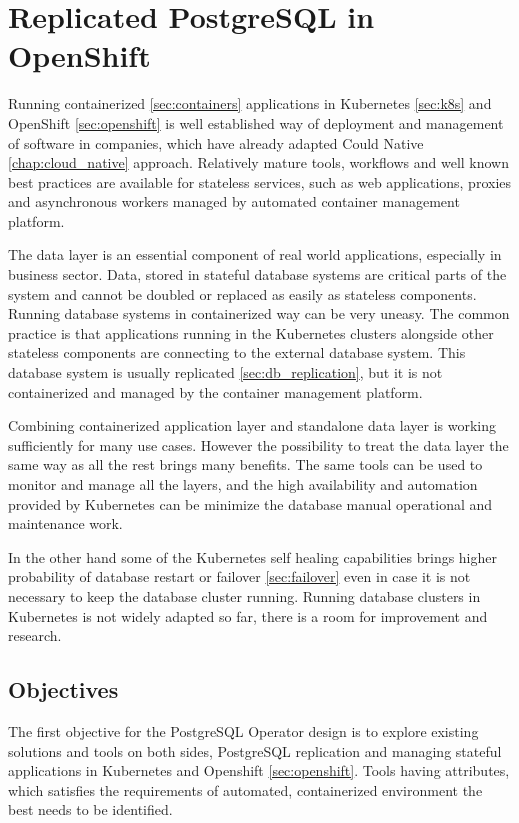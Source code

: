 \documentclass[
  digital, %
  twoside, %
  table,   %
  lof,     %
  lot,     %
]{fithesis3}
\begin{document}
\chapter{Replicated PostgreSQL in OpenShift}
Running containerized \ref{sec:containers} applications in Kubernetes \ref{sec:k8s} and OpenShift \ref{sec:openshift} is well established way of deployment and management of software in companies, which have already adapted Could Native \ref{chap:cloud_native} approach. Relatively mature tools, workflows and well known best practices are available for stateless services, such as web applications, proxies and asynchronous workers managed by automated container management platform.

The data layer is an essential component of real world applications, especially in business sector. Data, stored in stateful database systems are critical parts of the system and cannot be doubled or replaced as easily as stateless components. Running database systems in containerized way can be very uneasy. The common practice is that applications running in the Kubernetes clusters alongside other stateless components are connecting to the external database system. This database system is usually replicated \ref{sec:db_replication}, but it is not containerized and managed by the container management platform.

Combining containerized application layer and standalone data layer is working sufficiently for many use cases. However the possibility to treat the data layer the same way as all the rest brings many benefits. The same tools can be used to monitor and manage all the layers, and the high availability and automation provided by Kubernetes can be minimize the database manual operational and maintenance work.

In the other hand some of the Kubernetes self healing capabilities brings higher probability of database restart or failover \ref{sec:failover} even in case it is not necessary to keep the database cluster running. Running database clusters in Kubernetes is not widely adapted so far, there is a room for improvement and research.

\section{Objectives}
The first objective for the PostgreSQL Operator design is to explore existing solutions and tools on both sides, PostgreSQL replication and managing stateful applications in Kubernetes and Openshift \ref{sec:openshift}. Tools having attributes, which satisfies the requirements of automated, containerized environment the best needs to be identified.
\end{document}
